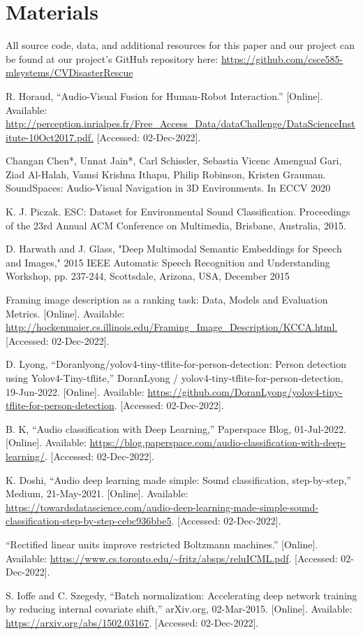 \documentclass{article}
\begin{document}
\section{Materials}
All source code, data, and additional resources for this paper and our project can be found at our project's GitHub repository here: \url{https://github.com/csce585-mlsystems/CVDisasterRescue}

\begin{thebibliography}{10}

R. Horaud, “Audio-Visual Fusion for Human-Robot Interaction.” [Online]. Available: \url{http://perception.inrialpes.fr/Free_Access_Data/dataChallenge/DataScienceInstitute-10Oct2017.pdf.} [Accessed: 02-Dec-2022].

Changan Chen*, Unnat Jain*, Carl Schissler, Sebastia Vicenc Amengual Gari, Ziad Al-Halah, Vamsi Krishna Ithapu, Philip Robinson, Kristen Grauman. SoundSpaces: Audio-Visual Navigation in 3D Environments. In ECCV 2020

K. J. Piczak. ESC: Dataset for Environmental Sound Classification. Proceedings of the 23rd Annual ACM Conference on Multimedia, Brisbane, Australia, 2015.

D. Harwath and J. Glass, "Deep Multimodal Semantic Embeddings for Speech and Images," 2015 IEEE Automatic Speech Recognition and Understanding Workshop, pp. 237-244, Scottsdale, Arizona, USA, December 2015 

Framing image description as a ranking task: Data, Models and Evaluation Metrics. [Online]. Available: \url{http://hockenmaier.cs.illinois.edu/Framing_Image_Description/KCCA.html.} [Accessed: 02-Dec-2022].

D. Lyong, “Doranlyong/yolov4-tiny-tflite-for-person-detection: Person detection using Yolov4-Tiny-tflite,” DoranLyong / yolov4-tiny-tflite-for-person-detection, 19-Jun-2022. [Online]. Available: \url{https://github.com/DoranLyong/yolov4-tiny-tflite-for-person-detection}. [Accessed: 02-Dec-2022]. 

B. K, “Audio classification with Deep Learning,” Paperspace Blog, 01-Jul-2022. [Online]. Available: \url{https://blog.paperspace.com/audio-classification-with-deep-learning/}. [Accessed: 02-Dec-2022].

K. Doshi, “Audio deep learning made simple: Sound classification, step-by-step,” Medium, 21-May-2021. [Online]. Available: \url{https://towardsdatascience.com/audio-deep-learning-made-simple-sound-classification-step-by-step-cebc936bbe5}. [Accessed: 02-Dec-2022].

“Rectified linear units improve restricted Boltzmann machines.” [Online]. Available: \url{https://www.cs.toronto.edu/~fritz/absps/reluICML.pdf}. [Accessed: 02-Dec-2022].

S. Ioffe and C. Szegedy, “Batch normalization: Accelerating deep network training by reducing internal covariate shift,” arXiv.org, 02-Mar-2015. [Online]. Available: \url{https://arxiv.org/abs/1502.03167}. [Accessed: 02-Dec-2022].

\end{thebibliography}
\end{document}
